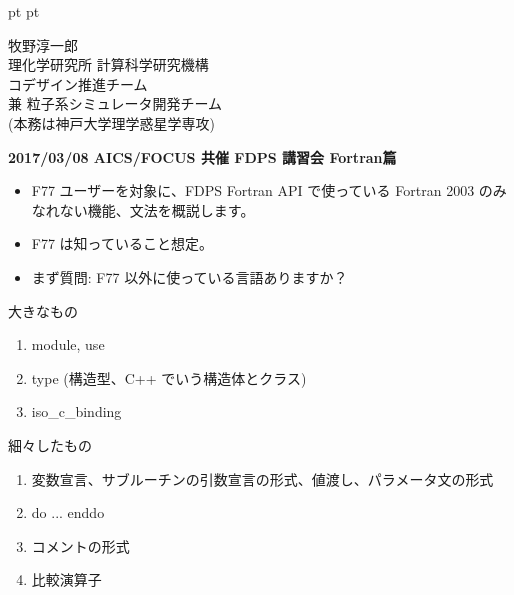 \documentclass[12pt,dvipdfmx]{article}
\begin{document}
\LARGE

 pt
 pt

\date{}





{\large

\begin{center}
牧野淳一郎\\
理化学研究所 計算科学研究機構\\
コデザイン推進チーム\\
兼 粒子系シミュレータ開発チーム\\
(本務は神戸大学理学惑星学専攻)

\leavevmode


\end{center}

}

\vfill

\normalsize\bf
\hfill 2017/03/08 AICS/FOCUS 共催 FDPS 講習会 Fortran篇



\begin{itemize}

\item F77 ユーザーを対象に、FDPS Fortran API で使っている Fortran 2003
のみなれない機能、文法を概説します。

\item F77 は知っていること想定。

\item まず質問: F77 以外に使っている言語ありますか？

\end{itemize}



大きなもの




\begin{enumerate}

\item module, use
\item type (構造型、C++ でいう構造体とクラス)
\item iso\_c\_binding

\end{enumerate}


細々したもの

\begin{enumerate}

\item 変数宣言、サブルーチンの引数宣言の形式、値渡し、パラメータ文の形式
\item do ... enddo
\item コメントの形式
\item 比較演算子
\end{enumerate}
\end{document}
